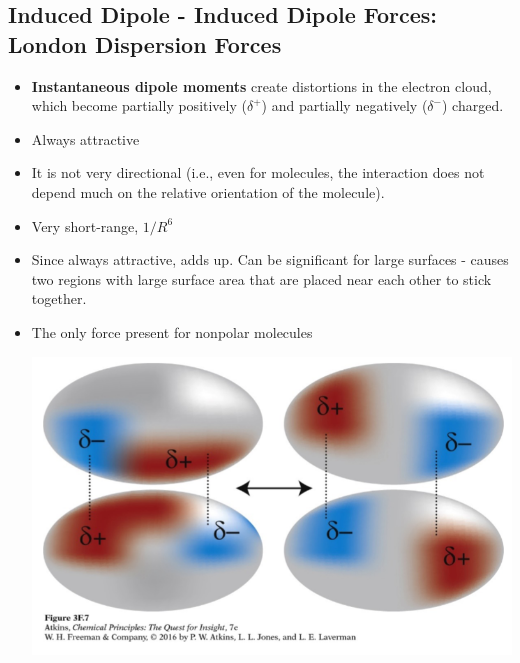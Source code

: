 \documentclass[10pt]{article}
\begin{document}
\subsection*{Induced Dipole - Induced Dipole Forces: London Dispersion Forces}
\begin{itemize}
    \item \textbf{Instantaneous dipole moments} create distortions in the electron cloud, which become partially positively ($\delta^+$) and partially negatively ($\delta^-$) charged.
    \item Always attractive
    \item It is not very directional (i.e., even for molecules, the interaction does not depend much on the relative orientation of the molecule).
    \item Very short-range, $1/R^6$
    \item Since always attractive, adds up.  Can be significant for large surfaces - causes two regions with large surface area that are placed near each other to stick together.
    \item The only force present for nonpolar molecules
    \begin{center}
        \includegraphics[scale=0.5]{W2_9.png}
    \end{center}
\end{itemize}
\end{document}
